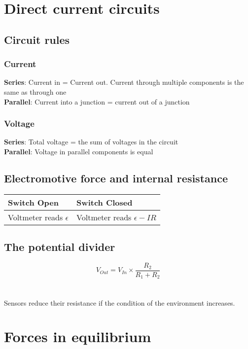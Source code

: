 \documentclass{article}[18pt]
\begin{document}
\section{Direct current circuits}
\subsection{Circuit rules}
\subsubsection{Current}
\textbf{Series}: Current in = Current out. Current through multiple components is the same as through one\\
\textbf{Parallel}: Current into a junction = current out of a junction
\subsubsection{Voltage}
\textbf{Series}: Total voltage = the sum of voltages in the circuit\\
\textbf{Parallel}: Voltage in parallel components is equal
\subsection{Electromotive force and internal resistance}
\begin{tabularx}{\textwidth}{|X|X|}
\hline
Switch Open&Switch Closed\\
\hline
Voltmeter reads $\epsilon$&Voltmeter reads $\epsilon-IR$\\
\hline
\end{tabularx}
\subsection{The potential divider}
$$V_{Out}=V_{In}\times\dfrac{R_2}{R_1+R_2}$$\\
\\
Sensors reduce their resistance if the condition of the environment increases.
\section{Forces in equilibrium}
\end{document}
